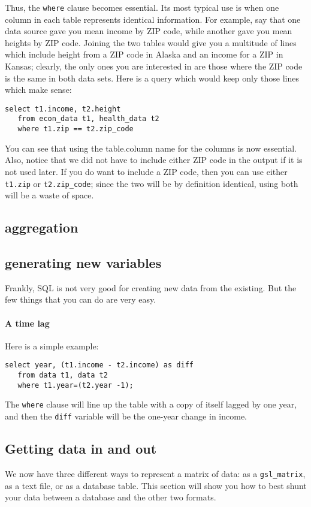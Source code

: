 Thus, the {\tt where} clause becomes essential. Its most typical use is
when one column in each table represents identical information. For
example, say that one data source gave you mean income by ZIP code,
while another gave you mean heights by ZIP code. Joining the two tables
would give you a multitude of lines which include height from a ZIP code
in Alaska and an income for a ZIP in Kansas; clearly, the only ones you
are interested in are those where the ZIP code is the same in both data
sets. Here is a query which would keep only those lines which make
sense:

\begin{verbatim}
select t1.income, t2.height
   from econ_data t1, health_data t2
   where t1.zip == t2.zip_code
\end{verbatim}

You can see that using the table.column name for the columns is now
essential. Also, notice that we did not have to include either ZIP code
in the output if it is not used later. If you do want to include a ZIP
code, then you can use either {\tt t1.zip} or {\tt t2.zip_code}; since
the two will be by definition identical, using both will be a waste of
space.


\subsection{aggregation}


\subsection{generating new variables} Frankly, SQL is not very good for
creating new data from the existing. But the few things that you can do
are very easy.

\paragraph{A time lag} Here is a simple example:
\begin{verbatim}
select year, (t1.income - t2.income) as diff
   from data t1, data t2
   where t1.year=(t2.year -1);
\end{verbatim}

The {\tt where} clause will line up the table with a copy of itself
lagged by one year, and then the {\tt diff} variable will be the
one-year change in income.



\subsection{Getting data in and out}
We now have three different ways to represent a matrix of data: as a {\tt gsl\_matrix}, as a text file,
or as a database table. This section will show you how to best shunt your data between a database and
the other two formats.

